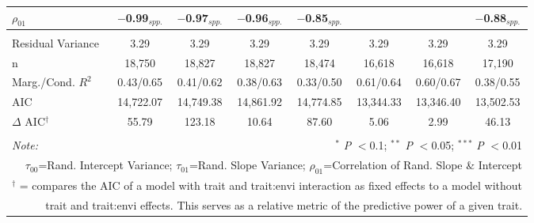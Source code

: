 \documentclass[12pt, letterpaper]{article}
\begin{document}
\begin{table}[h]
{\begin{tabular}{lccccccc}
  $\rho_{01}$ & $-$0.99$_{spp.}$ & $-$0.97$_{spp.}$ & $-$0.96$_{spp.}$ & $-$0.85$_{spp.}$ & & & $-$0.88$_{spp.}$ \\
\hline \\[-1.8ex] 
\rowcolor[gray]{.95} Residual Variance & 3.29 & 3.29 & 3.29 & 3.29 & 3.29 & 3.29 & 3.29\\
n & 18,750 & 18,827 & 18,827 & 18,474 & 16,618 & 16,618 & 17,190\\ 
\rowcolor[gray]{.95} Marg./Cond. $R^2$ & 0.43/0.65	& 0.41/0.62 &	0.38/0.63 & 0.33/0.50 & 0.61/0.64 &	0.60/0.67 & 0.38/0.55 \\
AIC   & 14,722.07 & 14,749.38 & 14,861.92 & 14,774.85 & 13,344.33 & 13,346.40 & 13,502.53 \\ 
\hline 
\rowcolor[gray]{.95}$\Delta$ AIC$^\dagger$  & 55.79 & 123.18 & 10.64 & 87.60 & 5.06 & 2.99 & 46.13  \\
\hline 
\hline \\[-1.8ex] 
\textit{Note:}  & \multicolumn{7}{r}{$^{*}$ \textit{P} $<$0.1; $^{**}$ \textit{P} $<$0.05; $^{***}$ \textit{P} $<$0.01}\\
\multicolumn{8}{r}{$\tau_{00}$=Rand. Intercept Variance; $\tau_{01}$=Rand. Slope Variance; $\rho_{01}$=Correlation of Rand. Slope \& Intercept}\\ 
\multicolumn{8}{r}{$^\dagger$ = compares the AIC of a model with trait and trait:envi interaction as fixed effects to a model without}\\
\multicolumn{8}{r}{trait and trait:envi effects. This serves as a relative metric of the predictive power of a given trait.}
\end{tabular}} 
\end{table} 
\end{document}
